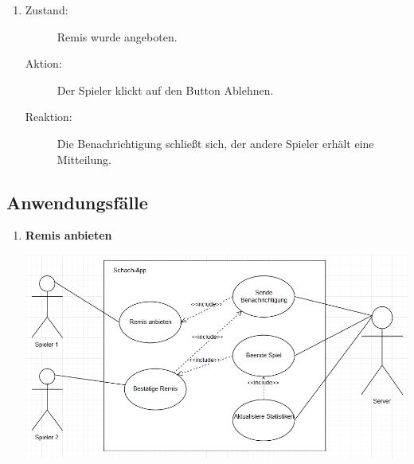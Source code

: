 \documentclass[parskip=full]{scrartcl}
\begin{document}
\begin{enumerate}
	\item
	\begin{description}
	\item[Zustand:] Remis wurde angeboten.
	\item[Aktion:] Der Spieler klickt auf den Button \glqq Ablehnen\grqq.
	\item[Reaktion:] Die Benachrichtigung schließt sich, der andere Spieler erhält eine Mitteilung.  \\
	\end{description}
	
	
	
	
\end{enumerate}
\subsection{Anwendungsfälle}
\begin{enumerate}
\item \textbf{Remis anbieten}

\includegraphics{Remis}
\end{enumerate}
\end{document}
